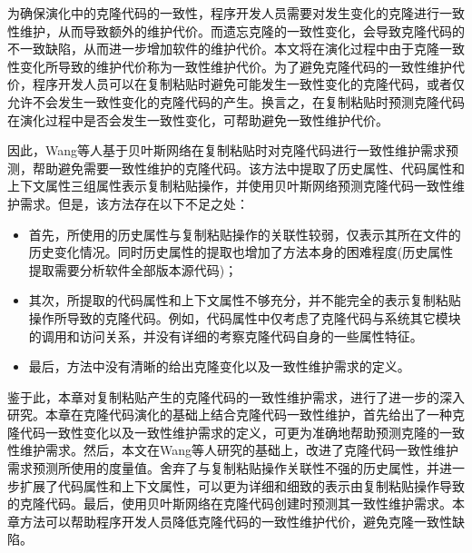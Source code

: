 为确保演化中的克隆代码的一致性，程序开发人员需要对发生变化的克隆进行一致性维护，从而导致额外的维护代价。而遗忘克隆的一致性变化，会导致克隆代码的不一致缺陷，从而进一步增加软件的维护代价\cite{aversano2007clones}\cite{bettenburg2009empirical}。本文将在演化过程中由于克隆一致性变化所导致的维护代价称为一致性维护代价。为了避免克隆代码的一致性维护代价，程序开发人员可以在复制粘贴时避免可能发生一致性变化的克隆代码，或者仅允许不会发生一致性变化的克隆代码的产生。换言之，在复制粘贴时预测克隆代码在演化过程中是否会发生一致性变化，可帮助避免一致性维护代价。

因此，Wang等人基于贝叶斯网络在复制粘贴时对克隆代码进行一致性维护需求预测，帮助避免需要一致性维护的克隆代码\cite{wang2012can}\cite{wang2014predicting}。该方法中提取了历史属性、代码属性和上下文属性三组属性表示复制粘贴操作，并使用贝叶斯网络预测克隆代码一致性维护需求。但是，该方法存在以下不足之处：
\begin{itemize}
\item
首先，所使用的历史属性与复制粘贴操作的关联性较弱，仅表示其所在文件的历史变化情况。同时历史属性的提取也增加了方法本身的困难程度(历史属性提取需要分析软件全部版本源代码)；
\item
其次，所提取的代码属性和上下文属性不够充分，并不能完全的表示复制粘贴操作所导致的克隆代码。例如，代码属性中仅考虑了克隆代码与系统其它模块的调用和访问关系，并没有详细的考察克隆代码自身的一些属性特征。
\item
最后，方法中没有清晰的给出克隆变化以及一致性维护需求的定义。
\end{itemize}

鉴于此，本章对复制粘贴产生的克隆代码的一致性维护需求，进行了进一步的深入研究。本章在克隆代码演化的基础上结合克隆代码一致性维护，首先给出了一种克隆代码一致性变化以及一致性维护需求的定义，可更为准确地帮助预测克隆的一致性维护需求。然后，本文在Wang等人研究的基础上，改进了克隆代码一致性维护需求预测所使用的度量值。舍弃了与复制粘贴操作关联性不强的历史属性，并进一步扩展了代码属性和上下文属性，可以更为详细和细致的表示由复制粘贴操作导致的克隆代码。最后，使用贝叶斯网络在克隆代码创建时预测其一致性维护需求。本章方法可以帮助程序开发人员降低克隆代码的一致性维护代价，避免克隆一致性缺陷。



